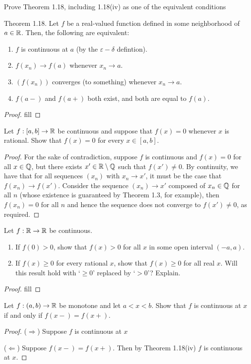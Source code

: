 \begin{exercise}{41}
Prove Theorem 1.18, including 1.18(iv) as one of the equivalent conditions

Theorem 1.18. Let $f$ be a real-valued function defined in some neighborhood of $a\in\mathbb{R}$. Then, the following are equivalent:
\begin{enumerate}
    \item $f$ is continuous at $a$ (by the $\varepsilon-\delta$ defintion).
    \item $f(x_n)\to f(a)$ whenever $x_n\to a$.
    \item $(f(x_n))$ converges (to something) whenever $x_n\to a$.
    \item $f(a-)$ and $f(a+)$ both exist, and both are equal to $f(a).$
\end{enumerate}
\end{exercise}
\begin{proof}
fill
\end{proof}

\begin{exercise}{45}
Let $f:[a,b]\to\mathbb{R}$ be continuous and suppose that $f(x)=0$ whenever $x$ is rational. Show that $f(x)=0$ for every $x\in[a,b]$.
\end{exercise}
\begin{proof}
For the sake of contradiction, suppose $f$ is continuous and $f(x)=0$ for all $x\in\mathbb{Q}$, but there exists $x'\in\mathbb{R}\setminus\mathbb{Q}$ such that $f(x')\neq 0$. By continuity, we have that for all sequences $(x_n)$ with $x_n\to x'$, it must be the case that $f(x_n)\to f(x')$. Consider the sequence $(x_n)\to x'$ composed of $x_n\in\mathbb{Q}$ for all $n$ (whose existence is guaranteed by Theorem 1.3, for example), then $f(x_n)=0$ for all $n$ and hence the sequence does not converge to $f(x')\neq 0$, as required.
\end{proof}

\begin{exercise}{46}
Let $f:\mathbb{R}\to\mathbb{R}$ be continuous.
\begin{enumerate}
    \item If $f(0)>0$, show that $f(x)>0$ for all $x$ in some open interval $(-a,a)$.
    \item If $f(x)\geq 0$ for every rational $x$, show that $f(x)\geq 0$ for all real $x$. Will this result hold with `$\geq 0$' replaced by `$>0$'? Explain.
\end{enumerate}
\end{exercise}
\begin{proof}
fill
\end{proof}

\begin{exercise}{49}
Let $f:(a,b)\to\mathbb{R}$ be monotone and let $a<x<b$. Show that $f$ is continuous at $x$ if and only if $f(x-)=f(x+)$.
\end{exercise}
\begin{proof}
($\Rightarrow$) Suppose $f$ is continuous at $x$

($\Leftarrow$) Suppose $f(x-)=f(x+)$. Then by Theorem 1.18(iv) $f$ is continuous at $x$.
\end{proof}